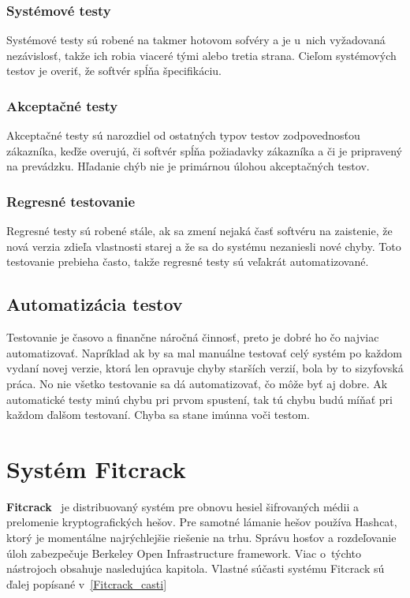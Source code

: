 \subsection{Systémové testy}
\label{system_tests}
Systémové testy sú robené na takmer hotovom sofvéry a je u~nich vyžadovaná nezávislosť, takže ich robia viaceré tými alebo tretia strana.
Cieľom systémových testov je overiť, že softvér spĺňa špecifikáciu.

\subsection{Akceptačné testy}
\label{acceptance_tests}
Akceptačné testy sú narozdiel od ostatných typov testov zodpovednosťou zákazníka, keďže overujú, či softvér spĺňa požiadavky zákazníka a či je pripravený na prevádzku.
Hľadanie chýb nie je primárnou úlohou akceptačných testov.

\subsection{Regresné testovanie}
\label{regression_tests}
Regresné testy sú robené stále, ak sa zmení nejaká časť softvéru na zaistenie, že nová verzia zdieľa vlastnosti starej a že sa do systému nezaniesli nové chyby.
Toto testovanie prebieha často, takže regresné testy sú veľakrát automatizované.

\section{Automatizácia testov}
\label{tests_automatization}
Testovanie je časovo a finančne náročná činnosť, preto je dobré ho čo najviac automatizovať.
Napríklad ak by sa mal manuálne testovať celý systém po každom vydaní novej verzie, ktorá len opravuje chyby starších verzií, bola by to sizyfovská práca.
No nie všetko testovanie sa dá automatizovať, čo môže byť aj dobre.
Ak automatické testy minú chybu pri prvom spustení, tak tú chybu budú míňať pri každom ďalšom testovaní.
Chyba sa stane imúnna voči testom.

\chapter{Systém Fitcrack} 
\label{Fitcrack}
\textbf{Fitcrack}~\cite{TR_TARZAN} je distribuovaný systém pre obnovu hesiel šifrovaných médii a prelomenie kryptografických hešov.
Pre samotné lámanie hešov používa Hashcat, ktorý je momentálne najrýchlejšie riešenie na trhu.
Správu hosťov a rozdeľovanie úloh zabezpečuje Berkeley Open Infrastructure framework.
Viac o~týchto nástrojoch obsahuje nasledujúca kapitola.
Vlastné súčasti systému Fitcrack sú ďalej popísané v~\ref{Fitcrack_casti}

